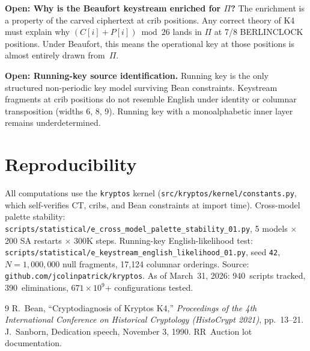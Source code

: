 \documentclass[11pt]{article}
\theoremstyle{remark}
\begin{document}
\medskip
\noindent\textbf{Open: Why is the Beaufort keystream enriched for $\Pi$?}
The enrichment is a property of the carved ciphertext at crib
positions.  Any correct theory of K4 must explain why
$(C[i] + P[i]) \bmod 26$ lands in $\Pi$ at 7/8 BERLINCLOCK
positions.  Under Beaufort, this means the operational key at
those positions is almost entirely drawn from~$\Pi$.

\medskip
\noindent\textbf{Open: Running-key source identification.}
Running key is the only structured non-periodic key model surviving
Bean constraints.  Keystream fragments at crib positions do not
resemble English under identity or columnar transposition (widths
6, 8, 9).  Running key with a monoalphabetic inner layer remains
underdetermined.

\section*{Reproducibility}

All computations use the \texttt{kryptos} kernel
({\small\texttt{src/kryptos/kernel/constants.py}}, which self-verifies CT,
cribs, and Bean constraints at import time).
Cross-model palette stability:
{\small\texttt{scripts/statistical/e\_cross\_model\_palette\_stability\_01.py}},
5 models $\times$ 200 SA restarts $\times$ 300K steps.
Running-key English-likelihood test:
{\small\texttt{scripts/statistical/e\_keystream\_english\_likelihood\_01.py}},
seed \texttt{42}, $N = 1{,}000{,}000$ null fragments, 17{,}124 columnar orderings.
Source: {\small\texttt{github.com/jcolinpatrick/kryptos}}.
As of March~31, 2026: 940~scripts tracked, 390~eliminations,
$671 \times 10^9$+ configurations tested.

\begin{thebibliography}{9}
 R.~Bean, ``Cryptodiagnosis of Kryptos K4,''
  \emph{Proceedings of the 4th International Conference on Historical
  Cryptology (HistoCrypt 2021)}, pp.~13--21.
 J.~Sanborn, Dedication speech, November 3, 1990.
  RR~Auction lot documentation.
\end{thebibliography}
\end{document}
